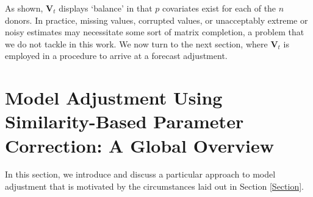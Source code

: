 \documentclass[11pt]{article}
\theoremstyle{definition}
\begin{document}
      As shown, $\textbf{V}_{t}$ displays `balance' in that $p$ covariates exist for each of the $n$ donors.  In practice, missing values, corrupted values, or unacceptably extreme or noisy estimates may necessitate some sort of matrix completion, a problem that we do not tackle in this work.  We now turn to the next section, where $\textbf{V}_{t}$ is employed in a procedure to arrive at a forecast adjustment. 

\section{Model Adjustment Using Similarity-Based Parameter Correction: A Global Overview}

In this section, we introduce and discuss a particular approach to model adjustment that is motivated by the circumstances laid out in Section \ref{Section}.
\end{document}
